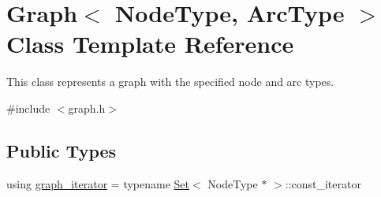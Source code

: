 \hypertarget{classGraph}{}\section{Graph$<$ Node\+Type, Arc\+Type $>$ Class Template Reference}
\label{classGraph}


This class represents a graph with the specified node and arc types.  




{\ttfamily \#include $<$graph.\+h$>$}

\subsection*{Public Types}
\begin{DoxyCompactItemize}
\item 
using \mbox{\hyperlink{classGraph_a695969c31e87f9e8319d74e5ca39024b}{graph\+\_\+iterator}} = typename \mbox{\hyperlink{classstanfordcpplib_1_1collections_1_1GenericSet}{Set}}$<$ Node\+Type $\ast$ $>$\+::const\+\_\+iterator
\end{DoxyCompactItemize}
